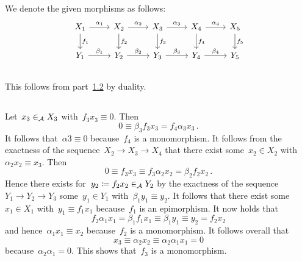 \section{}


We denote the given morphisms as follows:
\[
  \begin{tikzcd}
      X_1
      \arrow{r}[above]{\alpha_1}
      \arrow{d}[right]{f_1}
    & X_2
      \arrow{r}[above]{\alpha_2}
      \arrow{d}[right]{f_2}
    & X_3
      \arrow{r}[above]{\alpha_3}
      \arrow{d}[right]{f_3}
    & X_4
      \arrow{r}[above]{\alpha_4}
      \arrow{d}[right]{f_4}
    & X_5
      \arrow{d}[right]{f_5}
    \\
      Y_1
      \arrow{r}[above]{\beta_1}
    & Y_2
      \arrow{r}[above]{\beta_2}
    & Y_3
      \arrow{r}[above]{\beta_3}
    & Y_4
      \arrow{r}[above]{\beta_4}
    & Y_5
  \end{tikzcd}
\]



\subsection{}
\label{four lemma ugly}

This follows from part~\ref{four lemma nice} by duality.





\subsection{}
\label{four lemma nice}

Let~$x_3 \in_{\mathcal{A}} X_3$ with~$f_3 x_3 \equiv 0$.
Then
\[
          0
  \equiv  \beta_3 f_3 x_3
  =       f_4 \alpha_3 x_3 \,.
\]
It follows that~$\alpha 3 \equiv 0$ because~$f_4$ is a monomorphism.
It follows from the exactness of the sequence~$X_2 \to X_3 \to X_4$ that there exist some~$x_2 \in X_2$ with~$\alpha_2 x_2 \equiv x_3$.
Then
\[
          0
  \equiv  f_3 x_3
  \equiv  f_3 \alpha_2 x_2
  =       \beta_2 f_2 x_2 \,.
\]
Hence there exists for~$y_2 \coloneqq f_2 x_2 \in_{\mathcal{A}} Y_2$ by the exactness of the sequence~$Y_1 \to Y_2 \to Y_3$ some~$y_1 \in Y_1$ with~$\beta_1 y_1 \equiv y_2$.
It follows that there exist some~$x_1 \in X_1$ with~$y_1 \equiv f_1 x_1$ because~$f_1$ is an epimorphism.
It now holds that
\[
          f_2 \alpha_1 x_1
  =       \beta_1 f_1 x_1
  \equiv  \beta_1 y_1
  \equiv  y_2
  =       f_2 x_2
\]
and hence~$\alpha_1 x_1 \equiv x_2$ because~$f_2$ is a monomorphism.
It follows overall that
\[
          x_3
  \equiv  \alpha_2 x_2
  \equiv  \alpha_2 \alpha_1 x_1
  =       0
\]
because~$\alpha_2 \alpha_1 = 0$.
This shows that~$f_3$ is a monomorphism.






